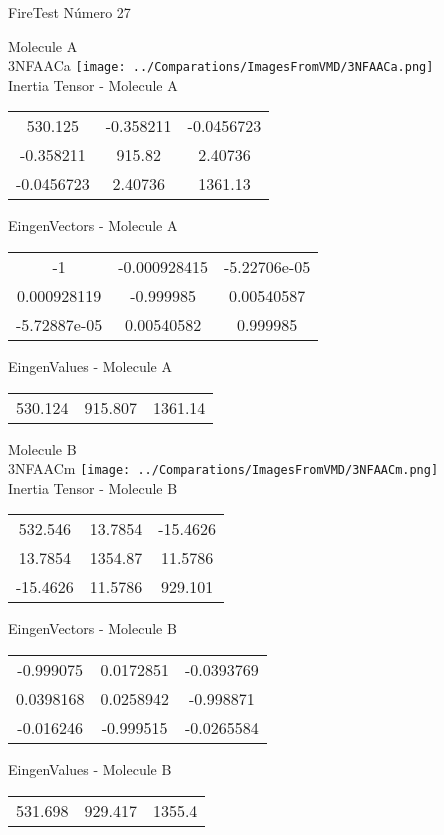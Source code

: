 \vtab[-2cm]
\begin{center}
{\large FireTest \tab Número 27}
\end{center}
\begin{multicols}{2}
\begin{center}

Molecule A \\ 
3NFAACa
\texttt{[image: ../Comparations/ImagesFromVMD/3NFAACa.png]}
\\
Inertia Tensor - Molecule A \\
\vtab

\begin{tabular}{|c c c|}
530.125	 & 	-0.358211	 & 	-0.0456723	 \\
-0.358211	 & 	915.82	 & 	2.40736	 \\
-0.0456723	 & 	2.40736	 & 	1361.13
\end{tabular}

\vtab
 EingenVectors - Molecule A     \\
\vtab
\begin{tabular}{|c c c|}
-1	 & 	-0.000928415	 & 	-5.22706e-05	 \\
0.000928119	 & 	-0.999985	 & 	0.00540587	 \\
-5.72887e-05	 & 	0.00540582	 & 	0.999985
\end{tabular}

\vtab
 EingenValues - Molecule A     \\
\vtab
\begin{tabular}{|c c c|}
530.124	 & 	915.807	 & 	1361.14	 \\
\end{tabular}
\columnbreak

Molecule B \\ 
3NFAACm
\texttt{[image: ../Comparations/ImagesFromVMD/3NFAACm.png]}
\\
Inertia Tensor - Molecule B \\
\vtab

\begin{tabular}{|c c c|}
532.546	 & 	13.7854	 & 	-15.4626	 \\
13.7854	 & 	1354.87	 & 	11.5786	 \\
-15.4626	 & 	11.5786	 & 	929.101
\end{tabular}

\vtab
 EingenVectors - Molecule B     \\
\vtab
\begin{tabular}{|c c c|}
-0.999075	 & 	0.0172851	 & 	-0.0393769	 \\
0.0398168	 & 	0.0258942	 & 	-0.998871	 \\
-0.016246	 & 	-0.999515	 & 	-0.0265584
\end{tabular}

\vtab
 EingenValues - Molecule B     \\
\vtab
\begin{tabular}{|c c c|}
531.698	 & 	929.417	 & 	1355.4	 \\
\end{tabular}

\end{center}
\end{multicols}
